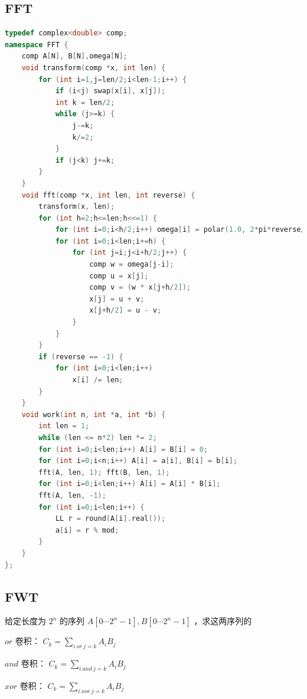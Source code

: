 \documentclass{article}
\begin{document}
\subsection{FFT}
\begin{lstlisting}[language=C++]
typedef complex<double> comp;
namespace FFT {
	comp A[N], B[N],omega[N];
	void transform(comp *x, int len) {
		for (int i=1,j=len/2;i<len-1;i++) {
			if (i<j) swap(x[i], x[j]);
			int k = len/2;
			while (j>=k) {
				j-=k;
				k/=2;
			}
			if (j<k) j+=k;
		}
	}
	void fft(comp *x, int len, int reverse) {
		transform(x, len);
		for (int h=2;h<=len;h<<=1) {
			for (int i=0;i<h/2;i++) omega[i] = polar(1.0, 2*pi*reverse/h*i);
			for (int i=0;i<len;i+=h) {
				for (int j=i;j<i+h/2;j++) {
					comp w = omega[j-i];
					comp u = x[j];
					comp v = (w * x[j+h/2]);
					x[j] = u + v;
					x[j+h/2] = u - v;
				}
			}
		}
		if (reverse == -1) {
			for (int i=0;i<len;i++)
				x[i] /= len;
		}
	}
	void work(int n, int *a, int *b) {
		int len = 1;
		while (len <= n*2) len *= 2;
		for (int i=0;i<len;i++) A[i] = B[i] = 0;
		for (int i=0;i<n;i++) A[i] = a[i], B[i] = b[i];
		fft(A, len, 1); fft(B, len, 1);
		for (int i=0;i<len;i++) A[i] = A[i] * B[i];
		fft(A, len, -1);
		for (int i=0;i<len;i++) {
			LL r = round(A[i].real());
			a[i] = r % mod;
		}
	}
};
\end{lstlisting}

\subsection{FWT}
给定长度为 $2^n$ 的序列 $A[0 \cdots 2^n-1], B[0 \cdots 2^n-1]$ ，求这两序列的

$or$ 卷积： $C_k = \sum\limits_{i \ or \ j=k} A_iB_j$

$and$ 卷积： $C_k = \sum\limits_{i \ and \ j=k} A_iB_j$

$xor$ 卷积： $C_k = \sum\limits_{i \ xor \ j=k} A_iB_j$
\end{document}
